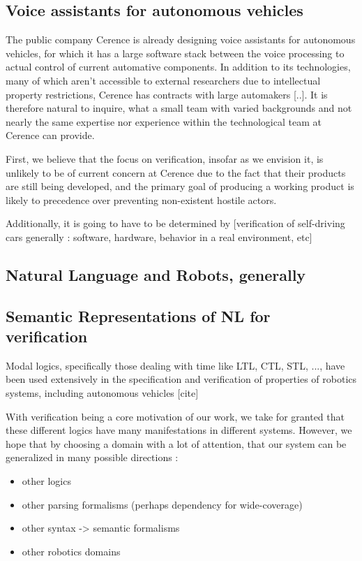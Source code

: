 \documentclass[a4paper, 11pt]{article}
\begin{document}
\subsection{Voice assistants for autonomous vehicles}

The public company Cerence \cite{} is already designing voice assistants for autonomous
vehicles, for which it has a large software stack between the voice processing
to actual control of current automative components. In addition to its 
technologies, many of which aren't accessible to external researchers due to
intellectual property restrictions, Cerence has contracts with large automakers
[..]. It is therefore natural to inquire, what a small team with varied
backgrounds and not nearly the same expertise nor experience within the
technological team at Cerence can provide.

First, we believe that the focus on verification, insofar as we envision it, is
unlikely to be of current concern at Cerence due to the fact that their products
are still being developed, and the primary goal of producing a working product
is likely to precedence over preventing non-existent hostile actors.

Additionally, it is going to have to be determined by 
[verification of self-driving cars generally : software, hardware, behavior in
a real environment, etc]


\subsection{Natural Language and Robots, generally}

\subsection{Semantic Representations of NL for verification}

Modal logics, specifically those dealing with time like LTL, CTL, STL, ..., have
been used extensively in the specification and verification of properties of
robotics systems, including autonomous vehicles [cite]

With verification being a core motivation of our work, we take for granted that
these different logics have many manifestations in different systems. However,
we hope that by choosing a domain with a lot of attention, that our system can
be generalized in many possible directions :

\begin{itemize}
\item other logics
\item other parsing formalisms (perhaps dependency for wide-coverage)
\item other syntax -> semantic formalisms
\item other robotics domains
\end{itemize}
\end{document}
